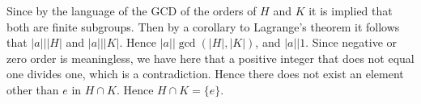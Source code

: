 \documentclass{article}
\begin{document}
Since by the language of the GCD of the orders of $H$ and $K$ it is implied that both are finite subgroups. Then by a corollary to Lagrange's theorem it follows that $|a|\big ||H|$ and $|a|\big | |K|$. Hence $|a|\big|\gcd(|H|,|K|)$, and $|a|\big | 1 $. Since negative or zero order is meaningless, we have here that a positive integer that does not equal one divides one, which is a contradiction. Hence there does not exist an element other than $e$ in $H\cap K$. Hence $H\cap K = \{e\}$.\\
\end{document}
